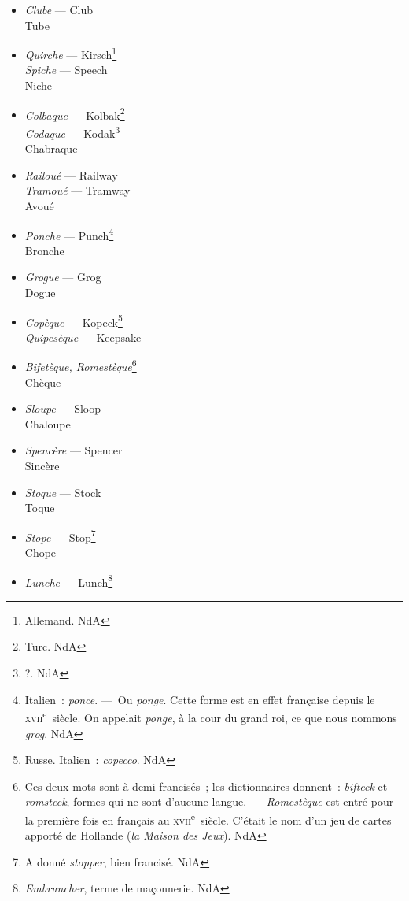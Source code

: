 \documentclass[french,twoside]{book} %
\begin{document}
\begin{itemize}[itemsep=0pt,]
\item {\itshape Clube} — Club \\
Tube
\item {\itshape Quirche} — Kirsch\footnote{Allemand. NdA} \\
{\itshape Spiche} — Speech \\
Niche
\item  {\itshape Colbaque} — Kolbak\footnote{Turc. NdA} \\
{\itshape Codaque} — Kodak\footnote{?. NdA} \\
Chabraque
\item  {\itshape Railoué} — Railway \\
{\itshape Tramoué} — Tramway \\
Avoué 
\item {\itshape Ponche} — Punch\footnote{ Italien : {\itshape ponce}. — Ou {\itshape ponge}. Cette forme est en effet française depuis le \textsc{xvii}\textsuperscript{e} siècle. On appelait {\itshape ponge}, à la cour du grand roi, ce que nous nommons {\itshape grog}. NdA} \\
Bronche
\item {\itshape Grogue} — Grog \\
Dogue
\item {\itshape Copèque} — Kopeck\footnote{ Russe. Italien : {\itshape copecco}. NdA} \\
{\itshape Quipesèque} — Keepsake
\item {\itshape Bifetèque, Romestèque}\footnote{ Ces deux mots sont à demi francisés ; les dictionnaires donnent : {\itshape bifteck} et {\itshape romsteck}, formes qui ne sont d’aucune langue. — {\itshape Romestèque} est entré pour la première fois en français au \textsc{xvii}\textsuperscript{e} siècle. C’était le nom d’un jeu de cartes apporté de Hollande ({\itshape la Maison des Jeux}). NdA} \\
Chèque
\item {\itshape Sloupe} — Sloop \\
Chaloupe
\item {\itshape Spencère} — Spencer \\
Sincère
\item {\itshape Stoque} — Stock \\
Toque
\item {\itshape Stope} — Stop\footnote{ A donné {\itshape stopper}, bien francisé. NdA} \\
Chope
\item {\itshape Lunche} — Lunch\footnote{ {\itshape Embruncher}, terme de maçonnerie. NdA} \\

\end{itemize}
\end{document}

